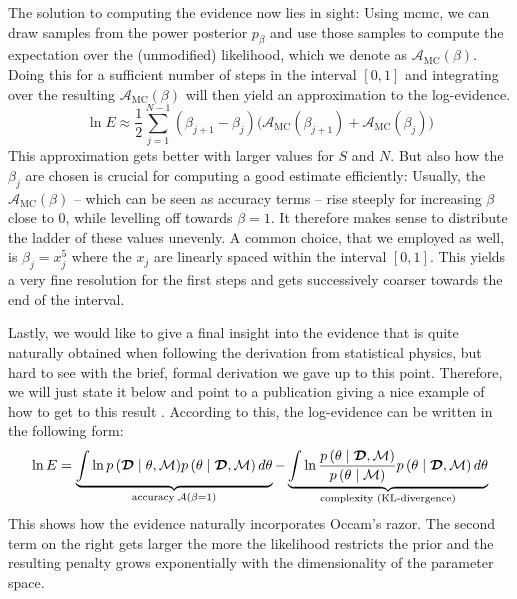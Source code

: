 \documentclass[\relativeRoot/main.tex]{subfiles}
\begin{document}
%
The solution to computing the evidence now lies in sight: Using \gls{mcmc}, we can draw samples from the power posterior $p_\beta$ and use those samples to compute the expectation over the (unmodified) likelihood, which we denote as $\mathcal{A}_\text{MC}(\beta)$. Doing this for a sufficient number of steps in the interval $\left[ 0, 1 \right]$ and integrating over the resulting $\mathcal{A}_\text{MC}(\beta)$ will then yield an approximation to the log-evidence.
%
\begin{equation}
    \ln{E} \approx \frac{1}{2} \sum_{j=1}^{N-1} \left( \beta_{j+1} - \beta_j \right) \big( \mathcal{A}_\text{MC}(\beta_{j+1}) + \mathcal{A}_\text{MC}(\beta_j) \big)
\end{equation}
%
This approximation gets better with larger values for $S$ and $N$. But also how the $\beta_j$ are chosen is crucial for computing a good estimate efficiently: Usually, the $\mathcal{A}_\text{MC}(\beta)$ -- which can be seen as accuracy terms -- rise steeply for increasing $\beta$ close to 0, while levelling off towards $\beta=1$. It therefore makes sense to distribute the ladder of these values unevenly. A common choice, that we employed as well, is $\beta_j = x_j^5$ where the $x_j$ are linearly spaced within the interval $[0, 1]$. This yields a very fine resolution for the first steps and gets successively coarser towards the end of the interval.

Lastly, we would like to give a final insight into the evidence that is quite naturally obtained when following the derivation from statistical physics, but hard to see with the brief, formal derivation we gave up to this point. Therefore, we will just state it below and point to a publication giving a nice example of how to get to this result \cite{aponte_introduction_2022}. According to this, the log-evidence can be written in the following form:
%
\begin{equation} \label{eq:ti:acc_vs_kl}
    \ln{E} = \underbrace{\int{ \ln{ p \left( \boldsymbol{\mathcal{D}} \mid \theta, \mathcal{M} \right) } p \left( \theta \mid \boldsymbol{\mathcal{D}}, \mathcal{M} \right) d\theta}}_{\text{accuracy} \; \mathcal{A}(\beta = 1)} - \underbrace{\int{ \ln{ \frac{p \left( \theta \mid \boldsymbol{\mathcal{D}}, \mathcal{M} \right)}{p \left( \theta \mid \mathcal{M} \right)} } p \left( \theta \mid \boldsymbol{\mathcal{D}}, \mathcal{M} \right) d\theta}}_\text{complexity (KL-divergence)}
\end{equation}
%
This shows how the evidence naturally incorporates Occam's razor. The second term on the right gets larger the more the likelihood restricts the prior and the resulting penalty grows exponentially with the dimensionality of the parameter space.
\end{document}

